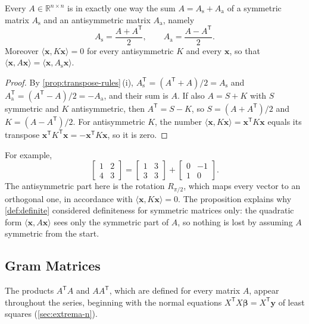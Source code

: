 \begin{proposition}
\label{prop:symmetric-parts}
Every $A\in\mathbb R^{n\times n}$ is in exactly one way the sum $A=A_{\mathrm s}+A_{\mathrm a}$ of a symmetric matrix $A_{\mathrm s}$ and an antisymmetric matrix $A_{\mathrm a}$, namely
\[
A_{\mathrm s}=\frac{A+A^{\mathsf T}}2,\qquad A_{\mathrm a}=\frac{A-A^{\mathsf T}}2 .
\]
Moreover $\langle\mathbf x,K\mathbf x\rangle=0$ for every antisymmetric $K$ and every $\mathbf x$, so that $\langle\mathbf x,A\mathbf x\rangle=\langle\mathbf x,A_{\mathrm s}\mathbf x\rangle$.
\end{proposition}

\begin{proof}
By \cref{prop:transpose-rules}\,(i), $A_{\mathrm s}^{\mathsf T}=(A^{\mathsf T}+A)/2=A_{\mathrm s}$ and $A_{\mathrm a}^{\mathsf T}=(A^{\mathsf T}-A)/2=-A_{\mathrm a}$, and their sum is $A$. If also $A=S+K$ with $S$ symmetric and $K$ antisymmetric, then $A^{\mathsf T}=S-K$, so $S=(A+A^{\mathsf T})/2$ and $K=(A-A^{\mathsf T})/2$. For antisymmetric $K$, the number $\langle\mathbf x,K\mathbf x\rangle=\mathbf x^{\mathsf T}K\mathbf x$ equals its transpose $\mathbf x^{\mathsf T}K^{\mathsf T}\mathbf x=-\mathbf x^{\mathsf T}K\mathbf x$, so it is zero.
\end{proof}

For example,
\[
\begin{bmatrix}1&2\\4&3\end{bmatrix}=\begin{bmatrix}1&3\\3&3\end{bmatrix}+\begin{bmatrix}0&-1\\1&0\end{bmatrix}.
\]
The antisymmetric part here is the rotation $R_{\pi/2}$, which maps every vector to an orthogonal one, in accordance with $\langle\mathbf x,K\mathbf x\rangle=0$. The proposition explains why \cref{def:definite} considered definiteness for symmetric matrices only: the quadratic form $\langle\mathbf x,A\mathbf x\rangle$ sees only the symmetric part of $A$, so nothing is lost by assuming $A$ symmetric from the start.

\subsection{Gram Matrices}

The products $A^{\mathsf T}A$ and $AA^{\mathsf T}$, which are defined for every matrix $A$, appear throughout the series, beginning with the normal equations $X^{\mathsf T}X\boldsymbol\beta=X^{\mathsf T}\mathbf y$ of least squares (\cref{sec:extrema-n}).

